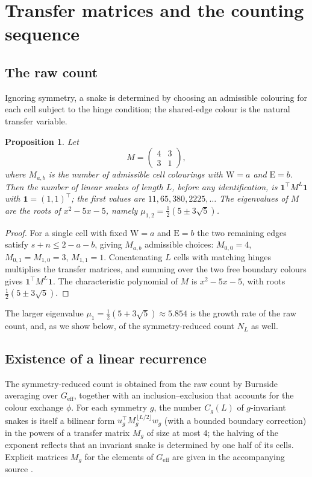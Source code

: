\documentclass[11pt,a4paper]{article}
\theoremstyle{plain}
\newtheorem{proposition}[theorem]{Proposition}
\theoremstyle{definition}
\theoremstyle{remark}
\numberwithin{equation}{section}
\begin{document}
\section{Transfer matrices and the counting sequence}\label{sec:transfer}

\subsection{The raw count}

Ignoring symmetry, a snake is determined by choosing an admissible
colouring for each cell subject to the hinge condition; the shared-edge
colour is the natural transfer variable.

\begin{proposition}\label{prop:raw}
Let
\[
M=\begin{pmatrix}4&3\\3&1\end{pmatrix},
\]
where $M_{a,b}$ is the number of admissible cell colourings with
$\mathrm W=a$ and $\mathrm E=b$. Then the number of linear snakes of
length $L$, before any identification, is $\mathbf 1^{\top}M^{L}\mathbf 1$
with $\mathbf 1=(1,1)^{\top}$; the first values are $11,65,380,2225,\dots$
The eigenvalues of $M$ are the roots of $x^{2}-5x-5$, namely
$\mu_{1,2}=\tfrac12(5\pm3\sqrt5)$.
\end{proposition}

\begin{proof}
For a single cell with fixed $\mathrm W=a$ and $\mathrm E=b$ the two
remaining edges satisfy $s+n\le 2-a-b$, giving $M_{a,b}$ admissible
choices: $M_{0,0}=4$, $M_{0,1}=M_{1,0}=3$, $M_{1,1}=1$. Concatenating $L$
cells with matching hinges multiplies the transfer matrices, and summing
over the two free boundary colours gives $\mathbf 1^{\top}M^{L}\mathbf 1$.
The characteristic polynomial of $M$ is $x^{2}-5x-5$, with roots
$\tfrac12(5\pm3\sqrt5)$.
\end{proof}

The larger eigenvalue $\mu_1=\tfrac12(5+3\sqrt5)\approx5.854$ is the growth
rate of the raw count, and, as we show below, of the symmetry-reduced
count $N_L$ as well.

\subsection{Existence of a linear recurrence}

The symmetry-reduced count is obtained from the raw count by Burnside
averaging over $G_{\mathrm{eff}}$, together with an inclusion--exclusion
that accounts for the colour exchange $\phi$. For each symmetry $g$, the
number $C_g(L)$ of $g$-invariant snakes is itself a bilinear form
$u_g^{\top}M_g^{\,\lfloor L/2\rfloor}w_g$ (with a bounded boundary
correction) in the powers of a transfer matrix $M_g$ of size at most $4$;
the halving of the exponent reflects that an invariant snake is determined
by one half of its cells. Explicit matrices $M_g$ for the elements of
$G_{\mathrm{eff}}$ are given in the accompanying source
\cite{source}.
\end{document}

